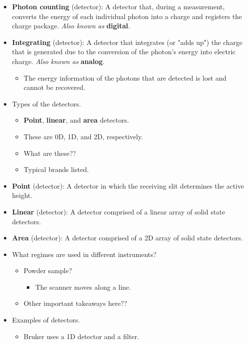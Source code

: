 \documentclass[../notes.tex]{subfiles}
\begin{document}
\begin{itemize}
\begin{itemize}
\begin{enumerate}[label={(\roman*)}]
        \end{enumerate}
    \end{itemize}
    \item \textbf{Photon counting} (detector): A detector that, during a measurement, converts the energy of each individual photon into a charge and registers the charge package. \emph{Also known as} \textbf{digital}.
    \item \textbf{Integrating} (detector): A detector that integrates (or "adds up") the charge that is generated due to the conversion of the photon's energy into electric charge. \emph{Also known as} \textbf{analog}.
    \begin{itemize}
        \item The energy information of the photons that are detected is lost and cannot be recovered.
    \end{itemize}
    \item Types of the detectors.
    \begin{itemize}
        \item \textbf{Point}, \textbf{linear}, and \textbf{area} detectors.
        \item These are 0D, 1D, and 2D, respectively.
        \item What are these??
        \item Typical brands listed.
    \end{itemize}
    \item \textbf{Point} (detector): A detector in which the receiving slit determines the active height.
    \item \textbf{Linear} (detector): A detector comprised of a linear array of solid state detectors.
    \item \textbf{Area} (detector): A detector comprised of a 2D array of solid state detectors.
    \item What regimes are used in different instruments?
    \begin{itemize}
        \item Powder sample?
        \begin{itemize}
            \item The scanner moves along a line.
        \end{itemize}
        \item Other important takeaways here??
    \end{itemize}
    \item Examples of detectors.
    \begin{itemize}
        \item Bruker uses a 1D detector and a  filter.

\end{itemize}
\end{itemize}
\end{document}
